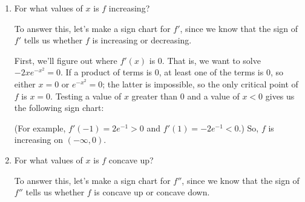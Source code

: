 \documentclass{article}
\begin{document}
\begin{enumerate}
\begin{enumerate}
  \item
    \begin{problem}[\nstretch{2}]
      For what values of $x$ is $f$ increasing?
    \end{problem}

    \begin{solution}
      To answer this, let's make a sign chart for $f'$, since we
        know that the sign of $f'$ tells us whether $f$ is increasing or
        decreasing.

      First, we'll figure out where $f'(x)$ is 0.  That is, we want to
      solve $-2x e^{-x^2} = 0$.  If a product of terms is 0, at least one
      of the terms is 0, so either $x = 0$ or $e^{-x^2} = 0$; the latter
      is impossible, so the only critical point of $f$ is $x = 0$.
      Testing a value of $x$ greater than 0 and a value of $x < 0$ gives
      us the following sign chart:
      \begin{center}
      \end{center}
      
      (For example, $f'(-1) = 2 e^{-1} > 0$ and $f'(1) = -2 e^{-1} < 0$.)
      So, $f$ is increasing on $\boxed{(-\infty, 0)}$.
    \end{solution}

  \item
    \begin{problem}[\vfill]
      For what values of $x$ is $f$ concave up?
    \end{problem}

    \begin{solution}
      To answer this, let's make a sign chart for $f''$, since we
        know that the sign of $f''$ tells us whether $f$ is concave up or
        concave down.


\end{solution}
\end{enumerate}
\end{enumerate}
\end{document}
